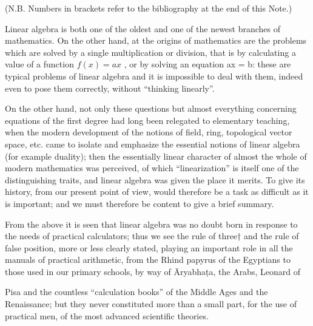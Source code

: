 
(N.B. Numbers in brackets refer to the bibliography at the end of this Note.)

Linear algebra is both one of the oldest and one of the newest branches of mathematics. On the other hand, at the origins of mathematics are the problems which are solved by a single multiplication or division, that is by calculating a value of a function \(f(x) = ax\) , or by solving an equation ax = b: these are typical problems of linear algebra and it is impossible to deal with them, indeed even to pose them correctly, without ``thinking linearly''.

On the other hand, not only these questions but almost everything concerning equations of the first degree had long been relegated to elementary teaching, when the modern development of the notions of field, ring, topological vector space, etc. came to isolate and emphasize the essential notions of linear algebra (for example duality); then the essentially linear character of almost the whole of modern mathematics was perceived, of which ``linearization'' is itself one of the distinguishing traits, and linear algebra was given the place it merits. To give its history, from our present point of view, would therefore be a task as difficult as it is important; and we must therefore be content to give a brief summary.

From the above it is seen that linear algebra was no doubt born in response to the needs of practical calculators; thus we see the rule of three† and the rule of false position, more or less clearly stated, playing an important role in all the manuals of practical arithmetic, from the Rhind papyrus of the Egyptians to those used in our primary schools, by way of Āryabhaṭa, the Arabs, Leonard of

Pisa and the countless ``calculation books'' of the Middle Ages and the Renaissance; but they never constituted more than a small part, for the use of practical men, of the most advanced scientific theories.

